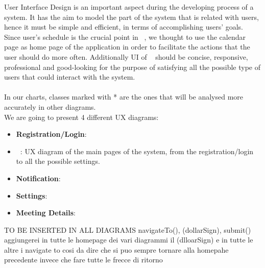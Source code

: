 User Interface Design is an important aspect during the developing process of a system. It has the aim to model the part of the system that is related with users, hence it must be simple and efficient, in terms of accomplishing users' goals. Since user's schedule is the crucial point in \projectname~, we thought to use the calendar page as home page of the application in order to facilitate the actions that the user should do more often. Additionally UI of \projectname~ should be concise, responsive, professional and good-looking for the purpose of satisfying all the possible type of users that could interact with the system.\\
\\
In our charts, classes marked with * are the ones that will be analysed more accurately in other diagrams.\\
We are going to present 4 different UX diagrams:
\begin{itemize}
	\item{\textbf{Registration/Login}}:
	\item{\textbf{\projectname~}}: UX diagram of the main pages of the system, from the registration/login to all the possible settings. 
	\item{\textbf{Notification}}:
	\item{\textbf{Settings}}:
	\item{\textbf{Meeting Details}}:
\end{itemize}

TO BE INSERTED IN ALL DIAGRAMS navigateTo(), (dollarSign), submit()
aggiungerei in tutte le homepage dei vari diagrammi il (dlloarSign) e in tutte le altre i navigate to cosi da dire che si puo sempre tornare alla homepahe precedente invece che fare tutte le frecce di ritorno